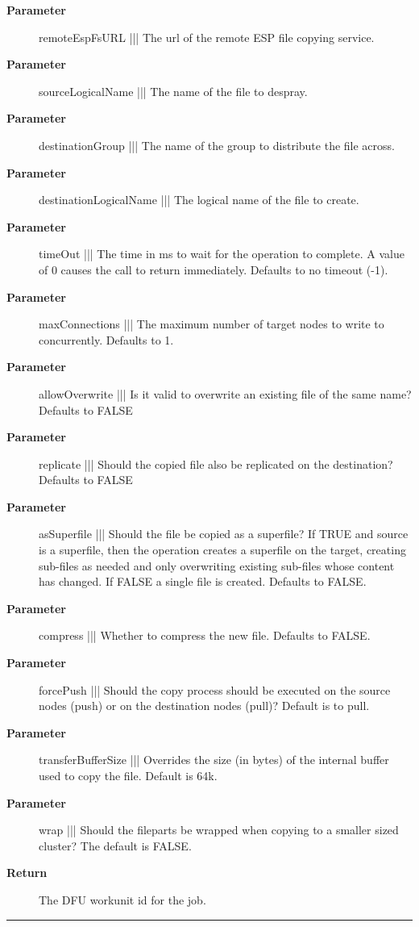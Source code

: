 \par
\begin{description}
\item [\textbf{Parameter}] remoteEspFsURL ||| The url of the remote ESP file copying service.
\item [\textbf{Parameter}] sourceLogicalName ||| The name of the file to despray.
\item [\textbf{Parameter}] destinationGroup ||| The name of the group to distribute the file across.
\item [\textbf{Parameter}] destinationLogicalName ||| The logical name of the file to create.
\item [\textbf{Parameter}] timeOut ||| The time in ms to wait for the operation to complete. A value of 0 causes the call to return immediately. Defaults to no timeout (-1).
\item [\textbf{Parameter}] maxConnections ||| The maximum number of target nodes to write to concurrently. Defaults to 1.
\item [\textbf{Parameter}] allowOverwrite ||| Is it valid to overwrite an existing file of the same name? Defaults to FALSE
\item [\textbf{Parameter}] replicate ||| Should the copied file also be replicated on the destination? Defaults to FALSE
\item [\textbf{Parameter}] asSuperfile ||| Should the file be copied as a superfile? If TRUE and source is a superfile, then the operation creates a superfile on the target, creating sub-files as needed and only overwriting existing sub-files whose content has changed. If FALSE a single file is created. Defaults to FALSE.
\item [\textbf{Parameter}] compress ||| Whether to compress the new file. Defaults to FALSE.
\item [\textbf{Parameter}] forcePush ||| Should the copy process should be executed on the source nodes (push) or on the destination nodes (pull)? Default is to pull.
\item [\textbf{Parameter}] transferBufferSize ||| Overrides the size (in bytes) of the internal buffer used to copy the file. Default is 64k.
\item [\textbf{Parameter}] wrap ||| Should the fileparts be wrapped when copying to a smaller sized cluster? The default is FALSE.
\item [\textbf{Return}] The DFU workunit id for the job.
\end{description}

\rule{\textwidth}{0.4pt}
